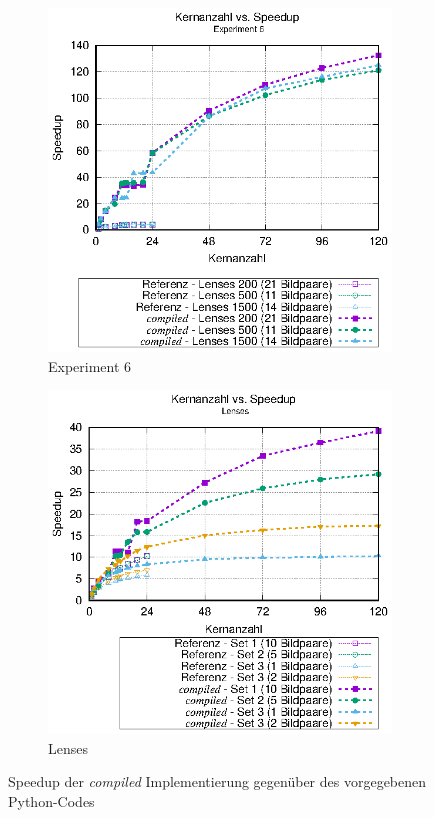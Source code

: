 \begin{center}
	\begin{figure}[htbp]
		\begin{subfigure}[b]{0.45\textwidth}
			\centering
			\includegraphics[width=\textwidth]{pdf/best_speedup_exp6}
			\caption{Experiment 6}
			\label{fig:best_speedup_exp6}
		\end{subfigure}
		\hfill
		\begin{subfigure}[b]{0.45\textwidth}
			\centering
			\includegraphics[width=\textwidth]{pdf/best_speedup_lenses}
			\caption{Lenses}
			\label{fig:best_speedup_lenses}
		\end{subfigure}
		\caption{Speedup der \textit{compiled} Implementierung gegenüber des vorgegebenen Python-Codes}
		\label{fig:best_speedup}
	\end{figure}
\end{center}

